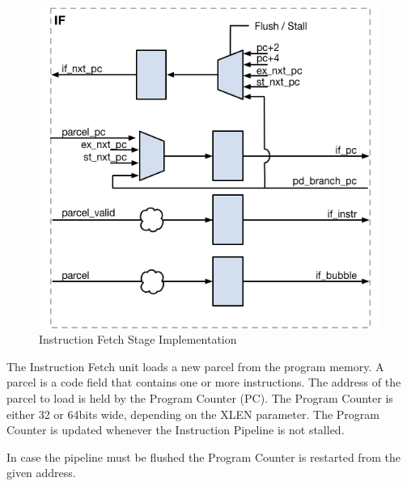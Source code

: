 \begin{figure}[h]
  \includegraphics{assets/img/Pipeline-IF}
  \caption{Instruction Fetch Stage Implementation}
\end{figure}

The Instruction Fetch unit loads a new parcel from the program memory.
A parcel is a code field that contains one or more instructions. 
The address of the parcel to load is held by the Program Counter (PC). 
The Program Counter is either 32 or 64bits wide, depending on the XLEN parameter. 
The Program Counter is updated whenever the Instruction Pipeline is not stalled.

In case the pipeline must be flushed the Program Counter is restarted from the given address.

